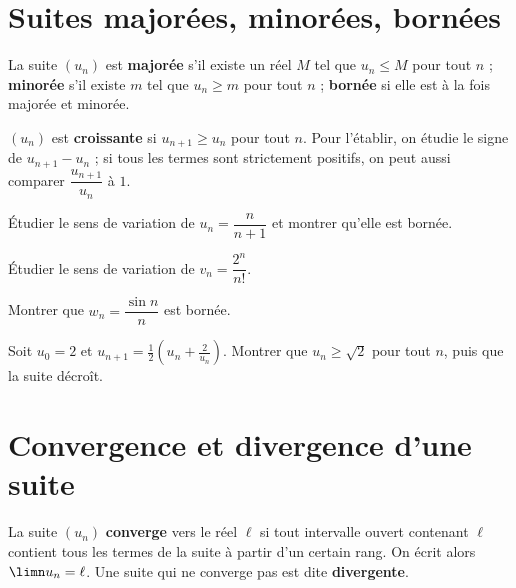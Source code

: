 \section{Suites majorées, minorées, bornées}

\begin{definition}
La suite $(u_{n})$ est \textbf{majorée} s'il existe un réel $M$ tel que
$u_{n} \leq M$ pour tout $n$ ; \textbf{minorée} s'il existe $m$ tel que
$u_{n} \geq m$ pour tout $n$ ; \textbf{bornée} si elle est à la fois majorée
et minorée.
\end{definition}

\begin{propriete}[monotonie]
$(u_{n})$ est \textbf{croissante} si $u_{n+1} \geq u_{n}$ pour tout $n$. Pour
l'établir, on étudie le signe de $u_{n+1}-u_{n}$ ; si tous les termes sont
strictement positifs, on peut aussi comparer $\dfrac{u_{n+1}}{u_{n}}$ à $1$.
\end{propriete}

\begin{entrainement}
\exo[\niveau{1}] Étudier le sens de variation de $u_{n} = \dfrac{n}{n+1}$ et
montrer qu'elle est bornée.

\exo[\niveau{2}] Étudier le sens de variation de $v_{n} = \dfrac{2^{n}}{n!}$.

\exo[\niveau{2}] Montrer que $w_{n} = \dfrac{\sin n}{n}$ est bornée.

\exo[\niveau{3}] Soit $u_{0} = 2$ et $u_{n+1} = \frac12\left(u_{n}
+\frac{2}{u_{n}}\right)$. Montrer que $u_{n} \geq \sqrt2$ pour tout $n$, puis
que la suite décroît.
\end{entrainement}

\section{Convergence et divergence d'une suite}

\begin{definition}
La suite $(u_{n})$ \textbf{converge} vers le réel $\ell$ si tout intervalle
ouvert contenant $\ell$ contient tous les termes de la suite à partir d'un
certain rang. On écrit alors $\limn u_{n} = \ell$. Une suite qui ne converge
pas est dite \textbf{divergente}.
\end{definition}


